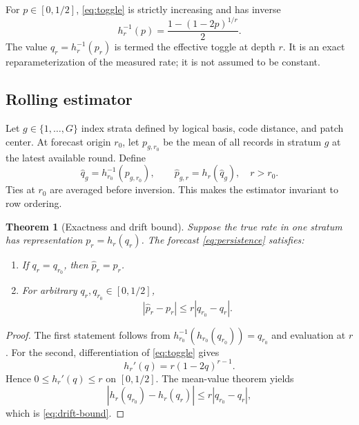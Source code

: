\documentclass[10pt,letterpaper,twoside]{article}
\newtheorem{theorem}{Theorem}
\begin{document}
For $p\in[0,1/2]$, \eqref{eq:toggle} is strictly increasing and has inverse
\begin{equation}
 h_r^{-1}(p)=\frac{1-(1-2p)^{1/r}}{2}.
 \label{eq:inverse}
\end{equation}
The value $q_r=h_r^{-1}(p_r)$ is termed the effective toggle at depth $r$.
It is an exact reparameterization of the measured rate; it is not assumed to be
constant.

\subsection{Rolling estimator}

Let $g\in\{1,\ldots,G\}$ index strata defined by logical basis, code distance,
and patch center. At forecast origin $r_0$, let $p_{g,r_0}$ be the mean of all
records in stratum $g$ at the latest available round. Define
\begin{equation}
 \widehat q_g=h_{r_0}^{-1}(p_{g,r_0}),
 \qquad
 \widehat p_{g,r}=h_r(\widehat q_g),\quad r>r_0.
 \label{eq:persistence}
\end{equation}
Ties at $r_0$ are averaged before inversion. This makes the estimator
invariant to row ordering.

\begin{theorem}[Exactness and drift bound]
\label{thm:drift}
Suppose the true rate in one stratum has representation
$p_r=h_r(q_r)$. The forecast \eqref{eq:persistence} satisfies:
\begin{enumerate}
\item If $q_r=q_{r_0}$, then $\widehat p_r=p_r$.
\item For arbitrary $q_r,q_{r_0}\in[0,1/2]$,
\begin{equation}
 |\widehat p_r-p_r|\le r|q_{r_0}-q_r|.
 \label{eq:drift-bound}
\end{equation}
\end{enumerate}
\end{theorem}

\begin{proof}
The first statement follows from
$h_{r_0}^{-1}(h_{r_0}(q_{r_0}))=q_{r_0}$ and evaluation at $r$. For the
second, differentiation of \eqref{eq:toggle} gives
\begin{equation}
 h_r'(q)=r(1-2q)^{r-1}.
\end{equation}
Hence $0\le h_r'(q)\le r$ on $[0,1/2]$. The mean-value theorem yields
\begin{equation}
 |h_r(q_{r_0})-h_r(q_r)|
 \le r|q_{r_0}-q_r|,
\end{equation}
which is \eqref{eq:drift-bound}.
\end{proof}
\end{document}
